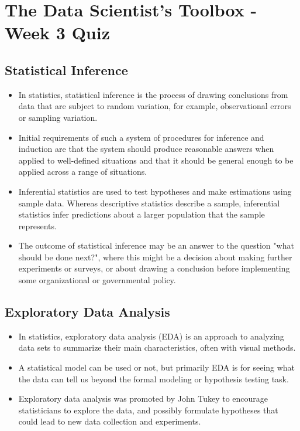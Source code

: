 \documentclass[12pt]{article}
\begin{document}
	
	\section*{The Data Scientist’s Toolbox - Week 3 Quiz}
	
	\subsection*{Statistical Inference}
	\begin{itemize}
		\item In statistics, statistical inference is the process of drawing conclusions from data that are subject to random variation, for example, observational errors or sampling variation.
		
		\item Initial requirements of such a system of procedures for inference and induction are that the system should produce reasonable answers when applied to well-defined situations and that it should be general enough to be applied across a range of situations. 
		\item Inferential statistics are used to test hypotheses and make estimations using sample data. Whereas descriptive statistics describe a sample, inferential statistics infer predictions about a larger population that the sample represents.
		\item 	The outcome of statistical inference may be an answer to the question "what should be done next?", where this might be a decision about making further experiments or surveys, or about drawing a conclusion before implementing some organizational or governmental policy.
	\end{itemize}
	\newpage
	
	\subsection*{Exploratory Data Analysis}
	\begin{itemize}
	\item	In statistics, exploratory data analysis (EDA) is an approach to analyzing data sets to summarize their main characteristics, often with visual methods. 
	\item A statistical model can be used or not, but primarily EDA is for seeing what the data can tell us beyond the formal modeling or hypothesis testing task. 
	\item Exploratory data analysis was promoted by John Tukey to encourage statisticians to explore the data, and possibly formulate hypotheses that could lead to new data collection and experiments. 
	\end{itemize}
\end{document}
